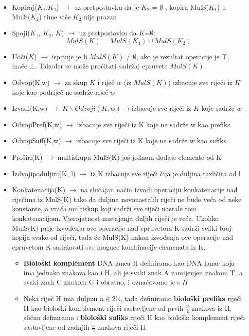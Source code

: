\documentclass[a4paper,oneside,12pt]{memoir} %
\begin{document}
\begin{spacing}{1.5}
\begin{defn}
    \begin{itemize}
        \item Kopiraj($K_1$,$K_2$) $\to$ uz pretpostavku da je $K_2$ = $\emptyset$ , kopira MulS($K_1$) u MulS($K_2$) time više $K_2$ nije prazan
        \item Spoji($K_1$, $K_2$, $K$) $\to$ uz pretpostavku da $K$=$\emptyset$: \[MulS(K)=MulS(K_1)\cup MulS(K_2) \]
        \item Uoči($K$) $\to$ ispituje je li $MulS(K)\neq\emptyset$, ako je rezultat operacije je $\top$, inače $\bot$. Također se može pročitati sadržaj epruvete $MulS(K)$.
        \item Odvoji(K,w) $\to$ za skup $K$ i riječ $w$ (iz $MulS(K)$) izbacuje sve riječi iz $K$ koje kao podriječ ne sadrže riječ $w$
        \item Izvadi(K,w) $\to$ $K\backslash Odvoji(K,w)\to $izbacuje sve riječi iz $K$ koje sadrže $w$
        \item Odvoji\textunderscore Pref(K,w) $\to$ izbacuje sve riječi iz K koje ne sadrže w kao prefiks
        \item Odvoji\textunderscore Suff(K,w) $\to$ izbacuje sve riječi iz K koje ne sadrže w kao sufiks
        \item Proširi(K) $\to$ multiskupu MulS(K) još jednom dodaje elemente od K
        \item Izdvoji\textunderscore po\textunderscore duljini(K, l) $\to$ iz K izbacuje sve riječi čija je duljina različita od l
        \item Konkatenacija(K) $\to$ na slučajan način izvodi operaciju konkatenacije nad riječima iz MulS(K) tako da duljina novonastalih riječi ne bude veća od neke konstante, a vraća multiskup koji sadrži sve riječi nastale tom konkatenacijom. Vjerojatnost nastajanja duljih riječi je veća. Ukoliko MulS(K) prije izvođenja ove operacije nad epruvetom K sadrži veliki broj kopija svake od riječi, tada će MulS(K) nakon izvođenja ove operacije nad epruvetom K sadržavati sve moguće kombinacije elemenata iz K.
            \begin{itemize}
                \item \textbf{Biološki komplement} DNA lanca H definiramo kao DNA lanac koja ima jednako znakova kao i H, ali je svaki znak A zamijenjen znakom T, a svaki znak C znakom G i obratno, i označavamo je s $\overline{H}$
                \item Neka riječ H ima duljinu $n \in 2\mathbb{N}$, tada definiramo \textbf{biološki prefiks} riječi H kao biološki komplement riječi sastavljene od prvih $\frac{n}{2}$ znakova iz H, slično definiramo i \textbf{biološki sufiks} riječi H kao biološki komplement riječi sastavljene od zadnjih $\frac{n}{2}$ znakova riječi H

\end{itemize}
\end{itemize}
\end{defn}
\end{spacing}
\end{document}
